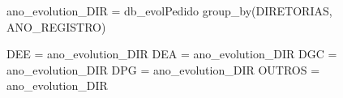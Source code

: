 \documentclass[]{article}
\newenvironment{Shaded}{\begin{snugshade}}{\end{snugshade}}
\newcommand{\StringTok}[1]{\textcolor[rgb]{0.31,0.60,0.02}{#1}}
\newcommand{\NormalTok}[1]{#1}
\begin{document}
\begin{Shaded}
\begin{Highlighting}[]
{{{{{{{{{{{{\NormalTok{ano_evolution_DIR = db_evolPedido %
\NormalTok{  group_by(DIRETORIAS, ANO_REGISTRO) %


\NormalTok{DEE = ano_evolution_DIR %
\NormalTok{DEA = ano_evolution_DIR %
\NormalTok{DGC = ano_evolution_DIR %
\NormalTok{DPG = ano_evolution_DIR %
\NormalTok{OUTROS = ano_evolution_DIR %

}}}}}}}}}}}}}}}}}}}
\end{Highlighting}
\end{Shaded}
\end{document}

